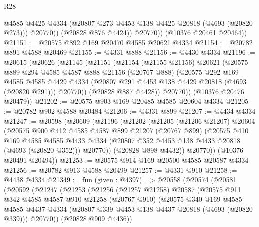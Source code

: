 \begin{lexlean}{R28}
\begin{coremodule}
                @4585
                @4425
                @4334
                (@20807 @273 @4453 @138 @4425 @20818 (@4693 (@20820 @273)))
                @20770))
            (@20828 @876 @4424))
          @20770))
      (@10376 @20461 @20464))
@21151 := @20575 @892 @169 @20470 @4585 @20621 @4334
@21154 := @20782 @891 @4588 @20469
@21155 := @4331 @888
@21156 := @4430 @4334
@21196 := @20615
    (@20626
      (@21145
        (@21151
          (@21154
            (@21155 @21156)
            @20621
            (@20575
              @889
              @294
              @4585
              @4587
              @888
              @21156
              (@20767 @888)
              (@20575
                @292
                @169
                @4585
                @4585
                @4429
                @4334
                (@20807 @291 @4453 @138 @4429 @20818 (@4693 (@20820 @291)))
                @20770))
            (@20828 @887 @4428))
          @20770))
      (@10376 @20476 @20479))
@21202 := @20575 @903 @169 @20485 @4585 @20604 @4334
@21205 := @20782 @902 @4588 @20484
@21206 := @4331 @899
@21207 := @4434 @4334
@21247 := @20598
    (@20609
      (@21196
        (@21202
          (@21205
            (@21206 @21207)
            @20604
            (@20575
              @900
              @412
              @4585
              @4587
              @899
              @21207
              (@20767 @899)
              (@20575
                @410
                @169
                @4585
                @4585
                @4433
                @4334
                (@20807 @352 @4453 @138 @4433 @20818 (@4693 (@20820 @352)))
                @20770))
            (@20828 @898 @4432))
          @20770))
      (@10376 @20491 @20494))
@21253 := @20575 @914 @169 @20500 @4585 @20587 @4334
@21256 := @20782 @913 @4588 @20499
@21257 := @4331 @910
@21258 := @4438 @4334
@21349 := fun (given : @4397) =>
  @20558
    (@20574
      (@20581
        (@20592
          (@21247
            (@21253
              (@21256
                (@21257 @21258)
                @20587
                (@20575
                  @911
                  @342
                  @4585
                  @4587
                  @910
                  @21258
                  (@20767 @910)
                  (@20575
                    @340
                    @169
                    @4585
                    @4585
                    @4437
                    @4334
                    (@20807 @339 @4453 @138 @4437 @20818 (@4693 (@20820 @339)))
                    @20770))
                (@20828 @909 @4436))

\end{coremodule}
\end{lexlean}
